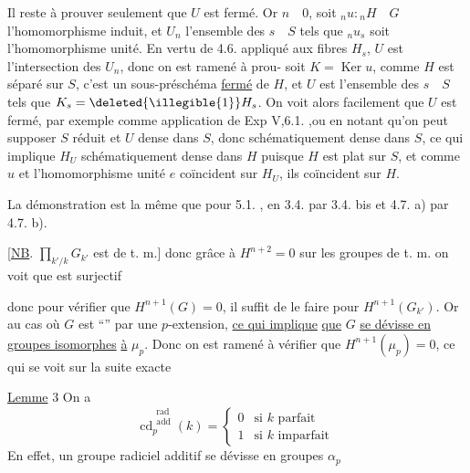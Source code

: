 Il reste à prouver seulement que $U$ est fermé. Or 
$n\quad0$, soit ${}_n u:{}_n H\quad G$ l'homomorphisme induit, et $U_n$ l'ensemble des
$s\quad S$ tels que ${}_n u_s$ soit l'homomorphisme unité. En vertu de 4.6. appliqué
aux fibres $H_s$, $U$ est l'intersection des $U_n$, donc on est ramené à prou-
soit $K=\operatorname{Ker}u$, comme $H$ est séparé sur $S$, c'est un sous-préschéma
\uline{fermé} de $H$, et $U$ est l'ensemble des $s\quad S$ tels que $K_s=\deleted{\illegible{1}}H_s$. On
voit alors  facilement que $U$ est fermé, par exemple comme
application de Exp V,6.1. ,ou en  notant qu'on peut
supposer $S$ réduit et $U$ dense dans $S$, donc schématiquement dense dans $S$,
ce qui implique $H_U$ schématiquement dense dans $H$ puisque $H$ est plat sur
$S$, et comme $u$ et l'homomorphisme unité $e$ coïncident sur $H_U$, ils
coïncident sur $H$.

La démonstration est la même que pour 5.1. , en 
3.4. par 3.4. bis et 4.7. a) par 4.7. b).


[\uline{NB}. $\prod_{k'/k}G_{k'}$ est de t. m.] donc grâce à
$H^{n+2}=0$ sur les groupes de t. m. on voit que
est surjectif

donc pour vérifier que $H^{n+1}(G)=0$, il suffit
de le faire pour $H^{n+1}(G_{k'})$. Or
  au cas où $G$ est ``''
par une $p$-extension, \uline{ce qui implique}
\uline{que} $G$ \uline{se dévisse en groupes isomorphes}
\uline{à} $\mu_p$. Donc on est ramené à vérifier
que $H^{n+1}(\mu_p)=0$, ce qui se voit sur
la suite exacte

\uline{Lemme} 3  On a
\[
\mathrm{cd}^{\substack{\text{rad}\\\text{add}}}_p(k)=
\begin{cases}0&\text{si }k\text{ parfait}\\1&\text{si }k\text{ imparfait}\end{cases}
\]
En effet, un groupe radiciel additif se dévisse en
groupes $\alpha_p$ \unsure{\ldots}

